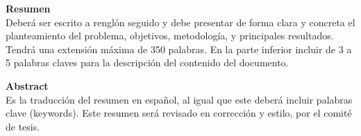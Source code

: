 {\large \color{GrisUAQ} \textbf{Resumen}}\\
Deberá ser escrito a renglón seguido y debe presentar de forma clara y concreta el planteamiento del problema, objetivos, metodología, y principales resultados. Tendrá una extensión máxima de 350 palabras. En la parte inferior incluir de 3 a 5 palabras claves para la descripción del contenido del documento.

\vspace{2cm}
{\large \color{GrisUAQ} \textbf{Abstract}}\\
Es la traducción del resumen en español, al igual que este deberá incluir palabras clave (keywords). Este resumen será revisado en corrección y estilo, por el comité de tesis.